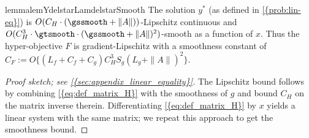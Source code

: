 
\begin{restatable}{lemma}{lemYdelstarLamdelstarSmooth}\label{lem:smoothness_of_ydelstar_lamdelstar}
The solution $y^*$ (as defined in \cref{{prob:lin-eq}}) is $O(C_H \cdot (\gssmooth + \|A\|))$-Lipschitz continuous and $O(C_H^3\cdot\gtsmooth\cdot(\gssmooth+\|A\|)^2)$-smooth as a function
of $x$. Thus the hyper-objective $F$ is gradient-Lipschitz  with a  smoothness constant of $C_F:=O\{ (L_f +C_f+C_g)C_H^3 S_g (L_g +\|A\|)^2\}.$ %
\end{restatable}
\begin{proof}[Proof sketch; see \cref{{sec:appendix_linear_equality}}]
 The Lipschitz bound follows by combining \cref{{eq:def_matrix_H}} with the smoothness of $g$ and bound $C_H$ on the matrix inverse therein. Differentiating \cref{{eq:def_matrix_H}} by $x$ yields a linear system with the same matrix;  we repeat this approach to get the  smoothness bound. 
\end{proof}



%


